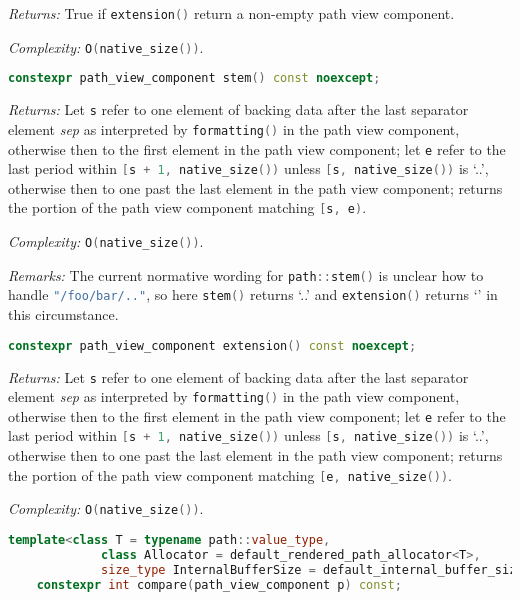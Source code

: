 \documentclass[11pt]{article}
\newcommand{\code}[2][cpp]{\lstinline[language=#1,basicstyle=\small\ttfamily]{#2}}
\newcommand{\desc}[1]{\textit{#1}}
\newcommand{\returns}{\desc{Returns: }}
\newcommand{\remarks}{\desc{Remarks: }}
\newcommand{\complexity}{\desc{Complexity: }}
\begin{document}
\returns True if \code{extension()} return a non-empty path view component.

\complexity \code{O(native_size())}.\\

\begin{lstlisting}[language=cpp]
    constexpr path_view_component stem() const noexcept;
\end{lstlisting}

\returns Let \code{s} refer to one element of backing data after the last separator element \emph{sep} as interpreted by \code{formatting()} in the path view component, otherwise then to the first element in the path view component; let \code{e} refer to the last period within \code{[s + 1, native_size())} unless \code{[s, native_size())} is `..', otherwise then to one past the last element in the path view component; returns the portion of the path view component matching \code{[s, e)}.

\complexity \code{O(native_size())}.

\remarks{The current normative wording for \code{path::stem()} is unclear how to handle \code{"/foo/bar/.."}, so here \code{stem()} returns `..' and \code{extension()} returns `' in this circumstance.}\\

\begin{lstlisting}[language=cpp]
    constexpr path_view_component extension() const noexcept;
\end{lstlisting}

\returns Let \code{s} refer to one element of backing data after the last separator element \emph{sep} as interpreted by \code{formatting()} in the path view component, otherwise then to the first element in the path view component; let \code{e} refer to the last period within \code{[s + 1, native_size())} unless \code{[s, native_size())} is `..', otherwise then to one past the last element in the path view component; returns the portion of the path view component matching \code{[e, native_size())}.

\complexity \code{O(native_size())}.\\

\begin{lstlisting}[language=cpp]
    template<class T = typename path::value_type,
             class Allocator = default_rendered_path_allocator<T>,
             size_type InternalBufferSize = default_internal_buffer_size>
    constexpr int compare(path_view_component p) const;
\end{lstlisting}
\end{document}
